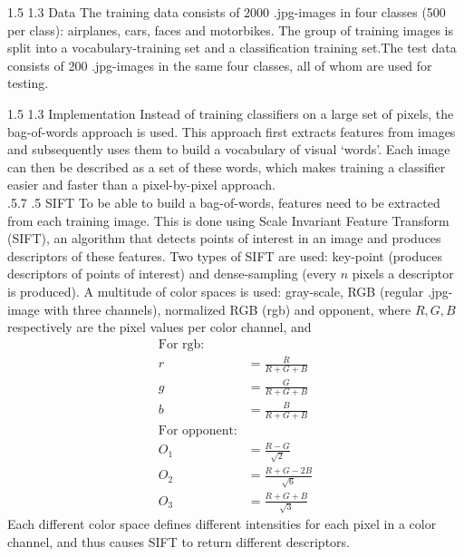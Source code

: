 \documentclass[12pt,a4paper]{amsart}
\makeatletter
\def\section{%
  \@startsection{section}{1}{\z@}%
  {1.5\linespacing\@plus\linespacing}%
  {1.3\linespacing}%
  {\bfseries\normalfont\scshape}
}
\def\subsection{\@startsection{subsection}{2}{\z@}%
  {.5\linespacing\@plus.7\linespacing}%
  {.5\linespacing}%
  {\small\normalfont}}
\makeatother
\begin{document}
\section{Data}
The training data consists of 2000 .jpg-images in four classes (500 per class): airplanes, cars, faces and motorbikes. The group of training images is split into a vocabulary-training set and a classification training set.The test data consists of 200 .jpg-images in the same four classes, all of whom are used for testing.

\section{Implementation}
Instead of training classifiers on a large set of pixels, the bag-of-words approach is used. This approach first extracts features from images and subsequently uses them to build a vocabulary of visual `words'. Each image can then be described as a set of these words, which makes training a classifier easier and faster than a pixel-by-pixel approach. \\
\subsection{SIFT}
To be able to build a bag-of-words, features need to be extracted from each training image. This is done using Scale Invariant Feature Transform (SIFT), an algorithm that detects points of interest in an image and produces descriptors of these features. Two types of SIFT are used: key-point (produces descriptors of points of interest) and dense-sampling (every $n$ pixels a descriptor is produced). A multitude of color spaces is used: gray-scale, RGB (regular .jpg-image with three channels), normalized RGB (rgb) and opponent, where $R,G,B$ respectively are the pixel values per color channel, and
\begin{align*}
\text{For rgb:}\\
r&= \frac{R}{R+G+B}\\
g&=\frac{G}{R+G+B} \\
b&= \frac{B}{R+G+B}\\
\text{For opponent:}\\
O_1&= \frac{R-G}{\sqrt{2}}\\
O_2&= \frac{R+G-2B}{\sqrt{6}}\\
O_3&= \frac{R+G+B}{\sqrt{3}}
\end{align*}
Each different color space defines different intensities for each pixel in a color channel, and thus causes SIFT to return different descriptors.
\end{document}
